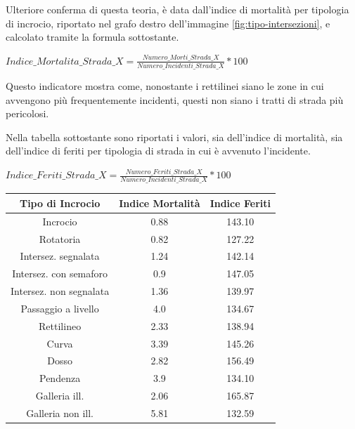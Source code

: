 \documentclass[a4paper,12pt]{report}
\begin{document}
Ulteriore conferma di questa teoria, è data dall'indice di mortalità per tipologia di incrocio, 
riportato nel grafo destro dell'immagine \ref{fig:tipo-intersezioni}, e calcolato tramite la 
formula sottostante. 

\begin{center}
    $Indice\_Mortalita\_Strada\_X = \displaystyle \frac{Numero\_Morti\_Strada\_X}{Numero\_Incidenti\_Strada\_X} * 100$ 
\end{center}

Questo indicatore mostra come, nonostante i rettilinei siano le zone in cui 
avvengono più frequentemente incidenti, questi non siano i tratti di 
strada più pericolosi. 

Nella tabella sottostante sono riportati i valori, sia dell'indice di mortalità, 
sia dell'indice di feriti per tipologia di strada in cui è avvenuto l'incidente.

\begin{center}
    $Indice\_Feriti\_Strada\_X = \displaystyle \frac{Numero\_Feriti\_Strada\_X}{Numero\_Incidenti\_Strada\_X} * 100$ 
\end{center}

\begin{center}
    \def\arraystretch{1.5}%
    \begin{tabular}{ |c|c|c| } 
    \hline
    Tipo di Incrocio & Indice Mortalità & Indice Feriti \\ 
    \hline
    \rowcolor{TableGray}
    Incrocio                & 0.88 & 143.10 \\
    Rotatoria               & 0.82 & 127.22 \\
    \rowcolor{TableGray}
    Intersez. segnalata     & 1.24 & 142.14 \\
    Intersez. con semaforo  & 0.9 & 147.05 \\
    \rowcolor{TableGray}
    Intersez. non segnalata & 1.36 & 139.97\\
    Passaggio a livello     & 4.0 & 134.67\\
    \rowcolor{TableGray}
    Rettilineo              & 2.33 & 138.94\\
    Curva                   & 3.39 & 145.26\\
    \rowcolor{TableGray}
    Dosso                   & 2.82 & 156.49\\
    Pendenza                & 3.9 & 134.10\\
    \rowcolor{TableGray}
    Galleria ill.           & 2.06 & 165.87\\
    Galleria non ill.       & 5.81 & 132.59\\
    \hline
    \end{tabular}
\end{center}
\end{document}
